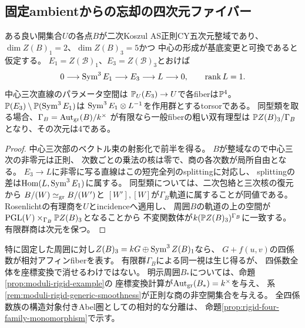 \subsection{固定ambientからの忘却の四次元ファイバー}
\begin{proposition}[中心三次直線の射影束]
\label{prop:artin-fixed-ambient-fiber}
ある良い開集合$U$の各点$B$が二次Koszul AS正則CY五次元整域であり、
$\dim Z(B)_1=2$、$\dim Z(B)_3=5$かつ
中心の形成が基底変更と可換であると仮定する。
$E_1=Z(\mathscr B)_1$、$E_3=Z(\mathscr B)_3$とおけば
\[
 0\longrightarrow\operatorname{Sym}^3E_1\longrightarrow E_3
 \longrightarrow L\longrightarrow0,\qquad\operatorname{rank} L=1.
\]
中心三次直線のパラメータ空間は
$\mathbb P_U(E_3)\to U$で各fiberは$\mathbb P^4$。
$\mathbb P(E_3)\setminus\mathbb P(\operatorname{Sym}^3E_1)$は
$\operatorname{Sym}^3E_1\otimes L^{-1}$を作用群とするtorsorである。
同型類を取る場合、$\Gamma_B=\operatorname{Aut}_{\operatorname{gr}}(B)/k^\times$
が有限なら一般fiberの粗い双有理型は
$\mathbb P Z(B)_3/\Gamma_B$となり、その次元は4である。
\end{proposition}
\begin{proof}
中心三次部のベクトル束の射影化で前半を得る。
$B$が整域なので中心三次の非零元は正則、
次数ごとの乗法の核は零で、商の各次数が局所自由となる。
$E_3\to L$に非零に写る直線はこの短完全列のsplittingに対応し、
splittingの差は$\operatorname{Hom}(L,\operatorname{Sym}^3E_1)$に属する。
同型類については、二次包絡と三次核の復元から
$B/(W)\simeq_{\operatorname{gr}}B/(W')$と
$[W'],[W]$が$\Gamma_B$軌道に属することが同値である。
Rosenlichtの有理商を$U$とincidenceへ適用し、
周囲$B$の軌道の上の空間が
$\mathrm{PGL}(V)\times_{\Gamma_B}\mathbb P Z(B)_3$となることから
不変関数体が$k(\mathbb P Z(B)_3)^{\Gamma_B}$に一致する。
有限群商は次元を保つ。
\end{proof}

\begin{remark}[四係数は標識を忘れても消えない]
特に固定した周囲に対し$Z(B)_3=kG\oplus\operatorname{Sym}^3Z(B)_1$なら、
$G+f(u,v)$の四係数が相対アフィンfiberを表す。
有限群$\Gamma_B$による同一視は生じ得るが、
四係数全体を座標変換で消せるわけではない。
明示周囲$B_*$については、命題\ref{prop:moduli-rigid-example}の
座標変換計算が$\operatorname{Aut}_{\operatorname{gr}}(B_*)=k^\times$を与え、
系\ref{rem:moduli-rigid-generic-smoothness}が正則な商の非空開集合を与える。
全四係数族の構造対象付きAbel圏としての相対的な分離は、
命題\ref{prop:rigid-four-family-monomorphism}で示す。
\end{remark}
